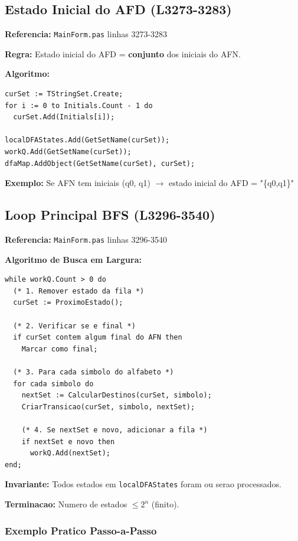 \documentclass[12pt,a4paper]{article}
\begin{document}
\subsection{Estado Inicial do AFD (L3273-3283)}

\textbf{Referencia:} \texttt{MainForm.pas} linhas 3273-3283

\textbf{Regra:} Estado inicial do AFD = \textbf{conjunto} dos iniciais do AFN.

\textbf{Algoritmo:}
\begin{lstlisting}[style=pascal]
curSet := TStringSet.Create;
for i := 0 to Initials.Count - 1 do
  curSet.Add(Initials[i]);
  
localDFAStates.Add(GetSetName(curSet));
workQ.Add(GetSetName(curSet));
dfaMap.AddObject(GetSetName(curSet), curSet);
\end{lstlisting}

\textbf{Exemplo:} Se AFN tem iniciais (q0, q1) $\rightarrow$ estado inicial do AFD = "\{q0,q1\}"

\subsection{Loop Principal BFS (L3296-3540)}

\textbf{Referencia:} \texttt{MainForm.pas} linhas 3296-3540

\textbf{Algoritmo de Busca em Largura:}

\begin{lstlisting}[style=pascal]
while workQ.Count > 0 do
  (* 1. Remover estado da fila *)
  curSet := ProximoEstado();
  
  (* 2. Verificar se e final *)
  if curSet contem algum final do AFN then
    Marcar como final;
  
  (* 3. Para cada simbolo do alfabeto *)
  for cada simbolo do
    nextSet := CalcularDestinos(curSet, simbolo);
    CriarTransicao(curSet, simbolo, nextSet);
    
    (* 4. Se nextSet e novo, adicionar a fila *)
    if nextSet e novo then
      workQ.Add(nextSet);
end;
\end{lstlisting}

\textbf{Invariante:} Todos estados em \texttt{localDFAStates} foram ou serao processados.

\textbf{Terminacao:} Numero de estados $\leq 2^n$ (finito).

\subsubsection{Exemplo Pratico Passo-a-Passo}
\end{document}
